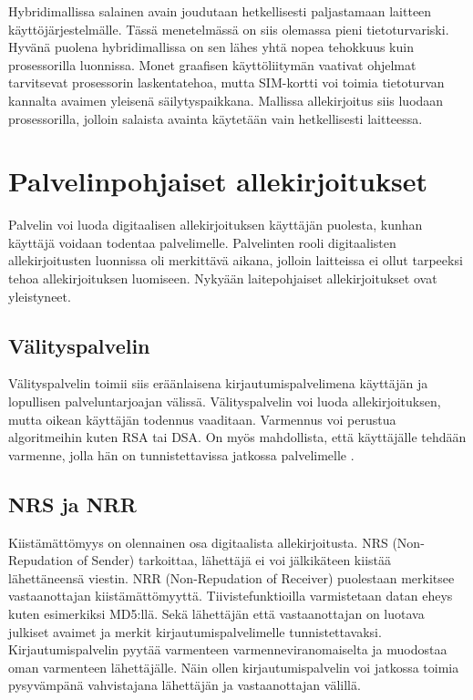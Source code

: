 \documentclass[finnish]{tktltiki2}
\theoremstyle{definition}
\theoremstyle{remark}
\begin{document}
Hybridimallissa salainen avain joudutaan hetkellisesti paljastamaan laitteen käyttöjärjestelmälle. Tässä menetelmässä on siis olemassa pieni tietoturvariski. Hyvänä puolena hybridimallissa on sen lähes yhtä nopea tehokkuus kuin prosessorilla luonnissa. Monet graafisen käyttöliitymän vaativat ohjelmat tarvitsevat prosessorin laskentatehoa, mutta SIM-kortti voi toimia tietoturvan kannalta avaimen yleisenä säilytyspaikkana. Mallissa allekirjoitus siis luodaan prosessorilla, jolloin salaista avainta käytetään vain hetkellisesti laitteessa.


\section{Palvelinpohjaiset allekirjoitukset}

Palvelin voi luoda digitaalisen allekirjoituksen käyttäjän puolesta, kunhan käyttäjä voidaan todentaa palvelimelle. Palvelinten rooli digitaalisten allekirjoitusten luonnissa oli merkittävä aikana, jolloin laitteissa ei ollut tarpeeksi tehoa allekirjoituksen luomiseen. Nykyään laitepohjaiset allekirjoitukset ovat yleistyneet. \cite{proxy}

\subsection{Välityspalvelin}

Välityspalvelin toimii siis eräänlaisena kirjautumispalvelimena käyttäjän ja lopullisen palveluntarjoajan välissä. Välityspalvelin voi luoda allekirjoituksen, mutta oikean käyttäjän todennus vaaditaan. Varmennus voi perustua algoritmeihin kuten RSA tai DSA. On myös mahdollista, että käyttäjälle tehdään varmenne, jolla hän on tunnistettavissa jatkossa palvelimelle \cite{proxy}.

\subsection{NRS ja NRR}

Kiistämättömyys on olennainen osa digitaalista allekirjoitusta. NRS (Non-Repudation of Sender) tarkoittaa, lähettäjä ei voi jälkikäteen kiistää lähettäneensä viestin. NRR (Non-Repudation of Receiver) puolestaan merkitsee vastaanottajan kiistämättömyyttä. Tiivistefunktioilla varmistetaan datan eheys kuten esimerkiksi MD5:llä. Sekä lähettäjän että vastaanottajan on luotava julkiset avaimet ja merkit kirjautumispalvelimelle tunnistettavaksi. Kirjautumispalvelin pyytää varmenteen varmenneviranomaiselta ja muodostaa oman varmenteen lähettäjälle. Näin ollen kirjautumispalvelin voi jatkossa toimia pysyvämpänä vahvistajana lähettäjän ja vastaanottajan välillä. \cite{gene}
\end{document}
